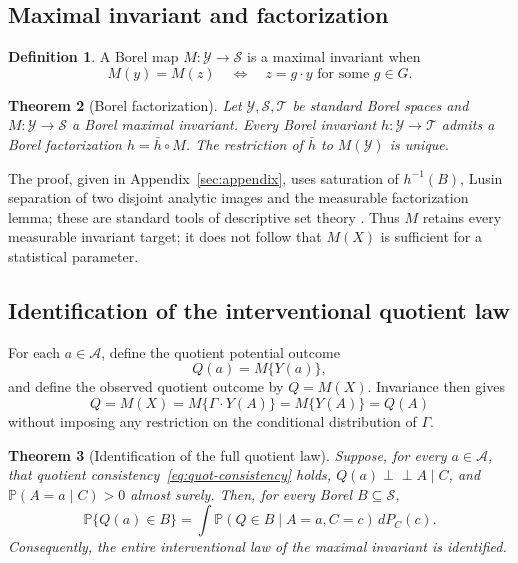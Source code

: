 \documentclass[11pt]{article}
\theoremstyle{plain}
\newtheorem{theorem}{Theorem}[section]
\theoremstyle{definition}
\newtheorem{definition}[theorem]{Definition}
\numberwithin{equation}{section}
\newcommand{\Prob}{\mathbb P}
\newcommand{\1}{\mathbf 1}
\newcommand{\calA}{\mathcal A}
\newcommand{\calS}{\mathcal S}
\newcommand{\calT}{\mathcal T}
\newcommand{\calY}{\mathcal Y}
\begin{document}
\subsection{Maximal invariant and factorization}

\begin{definition}
A Borel map $M:\calY\to\calS$ is a maximal invariant when
\[
M(y)=M(z)\quad\Longleftrightarrow\quad z=g\cdot y\text{ for some }g\in G.
\]
\end{definition}

\begin{theorem}[Borel factorization]\label{thm:factorization}
Let $\calY,\calS,\calT$ be standard Borel spaces and $M:\calY\to\calS$ a Borel maximal invariant. Every Borel invariant $h:\calY\to\calT$ admits a Borel factorization $h=\bar h\circ M$. The restriction of $\bar h$ to $M(\calY)$ is unique.
\end{theorem}

The proof, given in Appendix~\ref{sec:appendix}, uses saturation of $h^{-1}(B)$, Lusin separation of two disjoint analytic images and the measurable factorization lemma; these are standard tools of descriptive set theory \citep{Kechris1995}. Thus $M$ retains every measurable invariant target; it does not follow that $M(X)$ is sufficient for a statistical parameter.

\subsection{Identification of the interventional quotient law}
For each $a\in\calA$, define the quotient potential outcome
\[
Q(a)=M\{Y(a)\},
\]
and define the observed quotient outcome by $Q=M(X)$. Invariance then gives
\begin{equation}\label{eq:quot-consistency}
	Q
	=
	M(X)
	=
	M\{\Gamma\cdot Y(A)\}
	=
	M\{Y(A)\}
	=
	Q(A)
\end{equation}
without imposing any restriction on the conditional distribution of $\Gamma$.


\begin{theorem}[Identification of the full quotient law]\label{thm:gformula}
Suppose, for every $a\in\calA$, that quotient consistency~\eqref{eq:quot-consistency} holds, $Q(a)\perp\!\!\!\perp A\mid C$, and $\Prob(A=a\mid C)>0$ almost surely. Then, for every Borel $B\subseteq\calS$,
\begin{equation}\label{eq:gformula}
\Prob\{Q(a)\in B\}=\int \Prob(Q\in B\mid A=a,C=c)\,dP_C(c).
\end{equation}
Consequently, the entire interventional law of the maximal invariant is identified.
\end{theorem}
\end{document}
